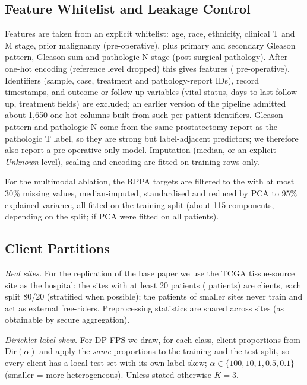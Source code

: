 \documentclass[journal]{IEEEtran}
\begin{document}
\subsection{Feature Whitelist and Leakage Control}
Features are taken from an explicit whitelist: age, race, ethnicity, clinical T and M stage, prior malignancy (pre-operative), plus primary and secondary Gleason pattern, Gleason sum and pathologic N stage (post-surgical pathology). After one-hot encoding (reference level dropped) this gives \nFeatFull{} features (\nFeatPreop{} pre-operative). Identifiers (sample, case, treatment and pathology-report IDs), record timestamps, and outcome or follow-up variables (vital status, days to last follow-up, treatment fields) are excluded; an earlier version of the pipeline admitted about 1{,}650 one-hot columns built from such per-patient identifiers. Gleason pattern and pathologic N come from the same prostatectomy report as the pathologic T label, so they are strong but label-adjacent predictors; we therefore also report a pre-operative-only model. Imputation (median, or an explicit \emph{Unknown} level), scaling and encoding are fitted on training rows only.

For the multimodal ablation, the \nProteinRaw{} RPPA targets are filtered to the \nProteinKept{} with at most 30\% missing values, median-imputed, standardised and reduced by PCA to 95\% explained variance, all fitted on the training split (about 115 components, depending on the split; \nPCAll{} if PCA were fitted on all \nMatched{} patients).

\subsection{Client Partitions}
\emph{Real sites.} For the replication of the base paper we use the TCGA tissue-source site as the hospital: the \nSites{} sites with at least 20 patients (\nSiteTotal{} patients) are clients, each split 80/20 (stratified when possible); the \nExternal{} patients of smaller sites never train and act as external free-riders. Preprocessing statistics are shared across sites (as obtainable by secure aggregation).

\emph{Dirichlet label skew.} For DP-FPS we draw, for each class, client proportions from $\mathrm{Dir}(\alpha)$ and apply the \emph{same} proportions to the training and the test split, so every client has a local test set with its own label skew; $\alpha \in \{100, 10, 1, 0.5, 0.1\}$ (smaller = more heterogeneous). Unless stated otherwise $K=3$.
\end{document}
